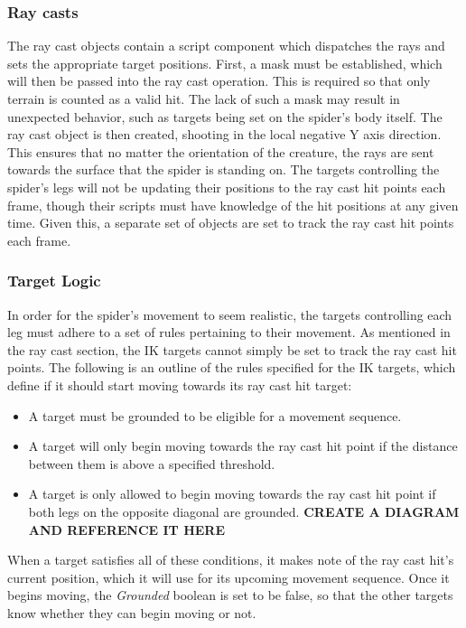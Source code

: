 \subsubsection{Ray casts}
The ray cast objects contain a script component which dispatches the rays and
sets the appropriate target positions. First, a mask must be established, which
will then be passed into the ray cast operation. This is required so that only
terrain is counted as a valid hit. The lack of such a mask may result in
unexpected behavior, such as targets being set on the spider's body itself. The
ray cast object is then created, shooting in the local negative Y axis
direction. This ensures that no matter the orientation of the creature, the rays
are sent towards the surface that the spider is standing on. The targets
controlling the spider's legs will not be updating their positions to the
ray cast hit points each frame, though their scripts must have knowledge of the
hit positions at any given time. Given this, a separate set of objects are set
to track the ray cast hit points each frame.

\subsubsection{Target Logic}
In order for the spider's movement to seem realistic, the targets controlling
each leg must adhere to a set of rules pertaining to their movement. As
mentioned in the ray cast section, the IK targets cannot simply be set to track
the ray cast hit points. The following is an outline of the rules specified for
the IK targets, which define if it should start moving towards its ray cast hit
target:
\begin{itemize}
    \item A target must be grounded to be eligible for a movement sequence.

    \item A target will only begin moving towards the ray cast hit point if the
        distance between them is above a specified threshold.

    \item A target is only allowed to begin moving towards the ray cast hit
        point if both legs on the opposite diagonal are grounded.
        \textbf{CREATE A DIAGRAM AND REFERENCE IT HERE}
\end{itemize}

When a target satisfies all of these conditions, it makes note of the ray cast
hit's current position, which it will use for its upcoming movement sequence.
Once it begins moving, the \textit{Grounded} boolean is set to be false, so that
the other targets know whether they can begin moving or not.

